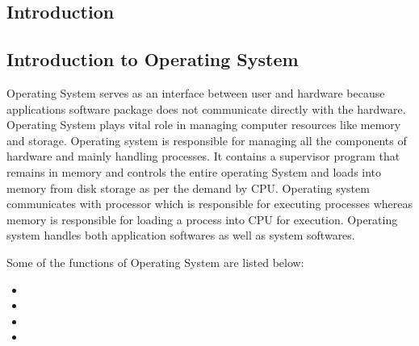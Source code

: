 \begin{onehalfspacing}
\chapter{Introduction}
\section{Introduction to Operating System} 
Operating System serves as an interface between user and hardware because applications software package does not communicate directly with the hardware. Operating System plays vital role in 
managing computer resources like memory and storage. Operating system is responsible for managing all the components of hardware and mainly handling processes. It contains a supervisor program that remains in memory and controls the entire operating System and loads into memory from disk storage as per the demand by CPU. Operating system communicates with processor which is responsible for executing processes whereas memory is responsible for loading a process into CPU for execution. Operating system handles both application softwares as well as system softwares.\newline

\par Some of the functions of Operating System are listed below:
\begin{itemize}
    \item {}
    \item {}
    \item {}
    \item {}
\end{itemize} 


\end{onehalfspacing}
